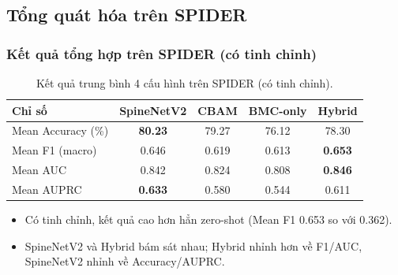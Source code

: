 \documentclass{beamer}
\numberwithin{figure}{section}
\numberwithin{table}{section}
\begin{document}
\subsection{Tổng quát hóa trên SPIDER}
\begin{frame}
\frametitle{Kết quả tổng hợp trên SPIDER (có tinh chỉnh)}
\begin{table}
\centering
\small
\begin{tabular}{lcccc}
\toprule
\textbf{Chỉ số} & \textbf{SpineNetV2} & \textbf{CBAM} & \textbf{BMC-only} & \textbf{Hybrid} \\
\midrule
Mean Accuracy (\%) & \textbf{80.23} & 79.27 & 76.12 & 78.30 \\
Mean F1 (macro)    & 0.646 & 0.619 & 0.613 & \textbf{0.653} \\
Mean AUC           & 0.842 & 0.824 & 0.808 & \textbf{0.846} \\
Mean AUPRC         & \textbf{0.633} & 0.580 & 0.544 & 0.611 \\
\bottomrule
\end{tabular}
\caption{Kết quả trung bình 4 cấu hình trên SPIDER (có tinh chỉnh).}
\end{table}
\begin{itemize}
    \item[$\rightarrow$] Có tinh chỉnh, kết quả cao hơn hẳn zero-shot (Mean F1 0.653 so với 0.362).
    \item[--] SpineNetV2 và Hybrid bám sát nhau; Hybrid nhỉnh hơn về F1/AUC, SpineNetV2 nhỉnh về Accuracy/AUPRC.
\end{itemize}
\end{frame}
\end{document}
